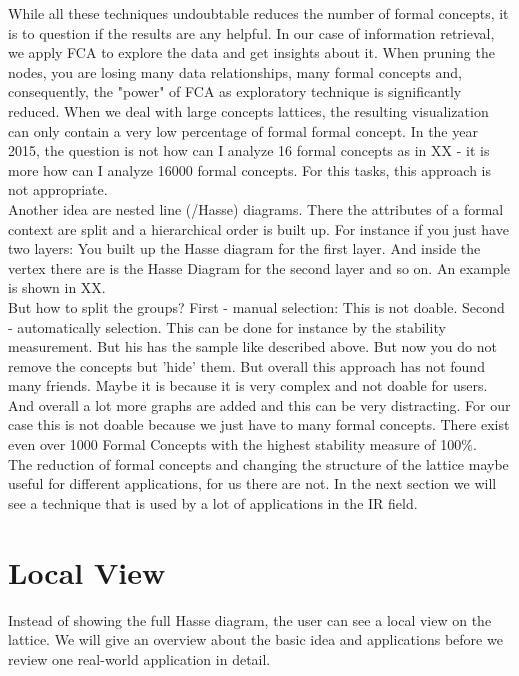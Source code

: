 \documentclass[11pt]{report}
\begin{document}
	While all these techniques undoubtable reduces the number of formal concepts, it is to question if the results are any helpful. In our case of information retrieval, we apply FCA to explore the data and get insights about it. When pruning the nodes, you are losing many data relationships, many formal concepts and, consequently, the "power" of FCA as exploratory technique is significantly reduced. When we deal with large concepts lattices, the resulting visualization can only contain a very low percentage of formal formal concept. In the year 2015, the question is not how can I analyze 16 formal concepts as in XX - it is more how can I analyze 16000 formal concepts. For this tasks, this approach is not appropriate. \\
	
	Another idea are nested line (/Hasse) diagrams. There the attributes of a formal context are split and a hierarchical order is built up. For instance if you just have two layers: You built up the Hasse diagram for the first layer. And inside the vertex there are is the Hasse Diagram for the second layer and so on. An example is shown in XX. \\
	
But how to split the groups? First - manual selection: This is not doable. Second - automatically selection. This can be done for instance by the stability measurement. But his has the sample like described above. But now you do not remove the concepts but 'hide' them. But overall this approach has not found many friends. Maybe it is because it is very complex and not doable for users. And overall a lot more graphs are added and this can be very distracting. For our case this is not doable because we just have to many formal concepts. There exist even over 1000 Formal Concepts with the highest stability measure of 100\%. \\

The reduction of formal concepts and changing the structure of the lattice maybe useful for different applications, for us there are not. In the next section we will see a technique that is used by a lot of applications in the IR field.

\section{Local View}

Instead of showing the full Hasse diagram, the user can see a local view on the lattice. We will give an overview about the basic idea and applications before we review one real-world application in detail. \\
\end{document}
